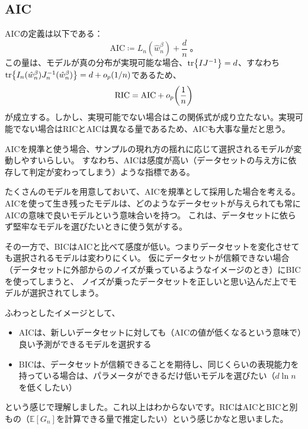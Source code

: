 \documentclass[dvipdfmx]{jsarticle}
\begin{document}
\subsection{AIC}
AICの定義は以下である：
\begin{equation}
    \text{AIC} \coloneqq L_n(\hat{w}_{n}^{\beta}) + \frac{d}{n}\;。
\end{equation}
この量は、モデルが真の分布が実現可能な場合、$\tr{IJ^{-1}} = d$、すなわち$\tr{I_n(\hat{w}_n^{\beta})J^{-1}_n(\hat{w}_n^{\beta})}=d + o_p(1/n)$であるため、
\begin{equation}
    \text{RIC} = \text{AIC} + o_p\qty(\frac{1}{n})
\end{equation}
が成立する。しかし、実現可能でない場合はこの関係式が成り立たない。実現可能でない場合はRICとAICは異なる量であるため、AICも大事な量だと思う。



\begin{mybox}
AICを規準と使う場合、サンプルの現れ方の揺れに応じて選択されるモデルが変動しやすいらしい。
すなわち、AICは感度が高い（データセットの与え方に依存して判定が変わってしまう）ような指標である。

たくさんのモデルを用意しておいて、AICを規準として採用した場合を考える。
AICを使って生き残ったモデルは、どのようなデータセットが与えられても常にAICの意味で良いモデルという意味合いを持つ。
これは、データセットに依らず堅牢なモデルを選びたいときに使う気がする。

その一方で、BICはAICと比べて感度が低い。つまりデータセットを変化させても選択されるモデルは変わりにくい。
仮にデータセットが信頼できない場合（データセットに外部からのノイズが乗っているようなイメージのとき）にBICを使ってしまうと、
ノイズが乗ったデータセットを正しいと思い込んだ上でモデルが選択されてしまう。

ふわっとしたイメージとして、
\begin{itemize}
    \item AICは、新しいデータセットに対しても（AICの値が低くなるという意味で）良い予測ができるモデルを選択する
    \item BICは、データセットが信頼できることを期待し、同じくらいの表現能力を持っている場合は、パラメータができるだけ低いモデルを選びたい（$d\ln{n}$を低くしたい）
\end{itemize}
という感じで理解しました。これ以上はわからないです。RICはAICとBICと別もの（$\mathbb{E}[G_n]$を計算できる量で推定したい）という感じかなと思いました。
\end{mybox}
\end{document}
